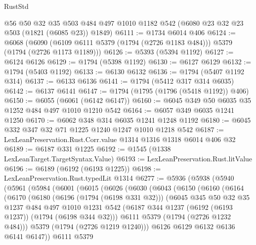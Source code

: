 \begin{lexlean}{RustStd}
\begin{coremodule}
    @56
    @50
    @32
    @35
    @503
    @484
    @497
    @1010
    @1182
    @542
    (@6080 @23 @32 @23 @503 (@1821 (@6085 @23)) @1849)
@6111 := @1734 @6014 @406
@6124 := @6068
    (@6090 (@6109 @6111 @5379 (@1794 (@2726 @1183 @484))) @5379 (@1794 (@2726 @1173 @1189)))
@6126 := @5393 (@5394 @1192)
@6127 := @6124 @6126
@6129 := @1794 (@5398 @1192)
@6130 := @6127 @6129
@6132 := @1794 (@5403 @1192)
@6133 := @6130 @6132
@6136 := @1794 (@5407 @1192 @314)
@6137 := @6133 @6136
@6141 := @1794 (@5412 @317 @314 @6035)
@6142 := @6137 @6141
@6147 := @1794 (@1795 (@1796 (@5418 @1192)) @406)
@6150 := @6055 (@6061 (@6142 @6147))
@6160 := @6045 @349 @50 @6035 @35 @1252 @484 @497 @1010 @1210 @542
@6164 := @6057 @349 @6035 @1241 @1250
@6170 := @6062 @348 @314 @6035 @1241 @1248 @1192
@6180 := @6045 @332 @347 @32 @71 @1225 @1240 @1247 @1010 @1218 @542
@6187 := LexLeanPreservation.Rust.Corr.value @1314 @1316 @1318 @6014 @406 @32
@6189 := @6187 @331 @1225
@6192 := @1545 (@1338 LexLeanTarget.TargetSyntax.Value)
@6193 := LexLeanPreservation.Rust.litValue
@6196 := @6189 (@6192 (@6193 @1225))
@6198 := LexLeanPreservation.Rust.typedLit @1314
@6277 := @5936
    (@5938
      (@5940
        (@5961
          (@5984
            (@6001
              (@6015
                (@6026
                  (@6030
                    (@6043
                      (@6150
                        (@6160
                          (@6164
                            (@6170
                              (@6180
                                (@6196 (@1794 (@6198 @331 @32)))
                                (@6045
                                  @345
                                  @50
                                  @32
                                  @35
                                  @1237
                                  @484
                                  @497
                                  @1010
                                  @1231
                                  @542
                                  (@6187 @344 @1237 (@6192 (@6193 @1237)) (@1794 (@6198 @344 @32)))
                                  @6111
                                  @5379
                                  (@1794 (@2726 @1232 @484)))
                                @5379
                                (@1794 (@2726 @1219 @1240)))
                              @6126
                              @6129
                              @6132
                              @6136
                              @6141
                              @6147))
                          @6111
                          @5379

\end{coremodule}
\end{lexlean}
